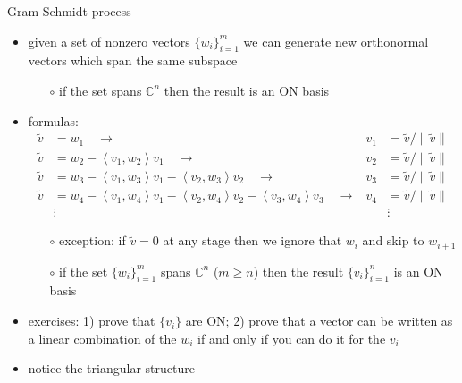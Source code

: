 \documentclass[10pt,hyperref]{beamer}
\newcommand{\CC}{\mathbb{C}}
\newcommand{\ip}[2]{\left<#1,#2\right>}
\begin{document}
\begin{frame}{Gram-Schmidt process}

\begin{itemize}
\item given a set of nonzero vectors $\{w_i\}_{i=1}^m$ we can generate new orthonormal vectors which span the same subspace
    \begin{itemize}
    \item[$\circ$] if the set spans $\CC^n$ then the result is an ON basis
    \end{itemize}
\item formulas:
\begin{align*}
\tilde v &= w_1 \quad \to & v_1 &= \tilde v/\|\tilde v\| \\
\tilde v &= w_2 - \ip{v_1}{w_2} v_1 \quad \to & v_2 &= \tilde v/\|\tilde v\| \\
\tilde v &= w_3 - \ip{v_1}{w_3} v_1 - \ip{v_2}{w_3} v_2 \quad \to & v_3 &= \tilde v/\|\tilde v\| \\
\tilde v &= w_4 - \ip{v_1}{w_4} v_1 - \ip{v_2}{w_4} v_2 - \ip{v_3}{w_4} v_3 \quad \to & v_4 &= \tilde v/\|\tilde v\| \\
&\vdots & &\vdots
\end{align*}
\vspace{-4mm}
    \begin{itemize}
    \item[$\circ$] exception: if $\tilde v=0$ at any stage then we ignore that $w_i$ and skip to $w_{i+1}$
    \item[$\circ$] if the set $\{w_i\}_{i=1}^m$ spans $\CC^n$ ($m\ge n$) then the result $\{v_i\}_{i=1}^n$ is an ON basis
    \end{itemize}
\item exercises: 1) prove that $\{v_i\}$ are ON; 2) prove that a vector can be written as a linear combination of the $w_i$ if and only if you can do it for the $v_i$
\item notice the triangular structure
\end{itemize}
\end{frame}
\end{document}
